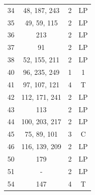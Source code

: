 \begin{table}
\begin{tabular}{c|c|c|c|}
        34 & 48, 187, 243 & 2 & LP \\
        35 & 49, 59, 115 & 2 & LP \\
        36 & 213 & 2 & LP \\
        37 & 91 & 2 & LP \\
        38 & 52, 155, 211 & 2 & LP \\
        40 & 96, 235, 249 & 1 & 1 \\
        41 & 97, 107, 121 & 4 & T \\
        42 & 112, 171, 241 & 2 & LP \\
        43 & 113 & 2 & LP \\
        44 & 100, 203, 217 & 2 & LP \\
        45 & 75, 89, 101 & 3 & C \\
        46 & 116, 139, 209 & 2 & LP \\
        50 & 179 & 2 & LP \\
        51 & - & 2 & LP \\
        54 & 147 & 4 & T \\
    \end{tabular}
    \raggedleft
    \begin{tabular}{|c|c|c|c}
        

\end{tabular}
\end{table}
